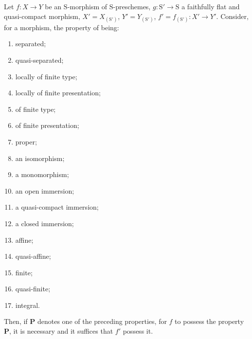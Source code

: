 \begin{proposition}[2.7.1]
\label{IV.2.7.1}
Let $f:X\to Y$ be an $\mathrm{S}$-morphism of $\mathrm{S}$-preschemes, $g:\mathrm{S}'\to\mathrm{S}$
a faithfully flat and quasi-compact morphism, $X'=X_{(\mathrm{S}')}$, $Y'=Y_{(\mathrm{S}')}$, $f'=f_{(\mathrm{S}')}:X'\to Y'$. Consider, for a morphism, the property of being:
\begin{enumerate}[label=(\roman*)]
  \item separated;
  \item quasi-separated;
  \item locally of finite type;
  \item locally of finite presentation;
  \item of finite type;
  \item of finite presentation;
  \item proper;
  \item an isomorphism;
  \item a monomorphism;
  \item an open immersion;
  \item a quasi-compact immersion;
  \item a closed immersion;
  \item affine;
  \item quasi-affine;
  \item finite;
  \item quasi-finite;
  \item integral.
\end{enumerate}
Then, if $\mathbf{P}$ denotes one of the preceding properties, for $f$ to possess the property $\mathbf{P}$, it is necessary
and it suffices that $f'$ possess it.
\end{proposition}

